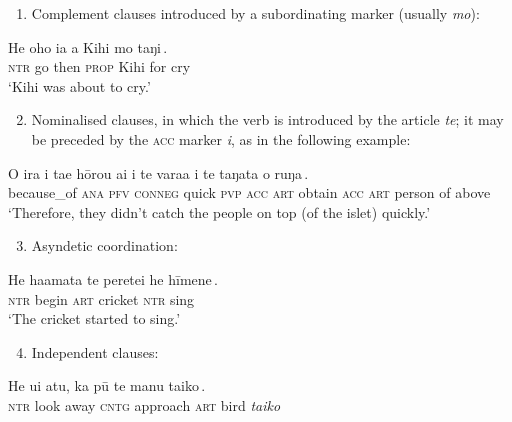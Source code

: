 \begin{enumerate}
\item 
Complement clauses introduced by a subordinating marker (usually \textit{mo}):
\end{enumerate}

\ea\label{ex:11.28}
\gll He oho ia a Kihi {\ob}mo taŋi\,{\cb}.\\
\textsc{ntr} go then \textsc{prop} Kihi {\db}for cry\\

\glt
‘Kihi was about to cry.’ \textstyleExampleref{[R215.024]} 
\z

\begin{enumerate}
\setcounter{enumi}{1}
\item 
Nominalised  clauses, in which the verb is introduced by the article \textit{te}; it may be preceded by the \textsc{acc} marker \textit{i}, as in the following example:
\end{enumerate}

\ea\label{ex:11.29}
\gll {\ꞌ}O ira i ta{\ꞌ}e hōrou ai {\ob}i te vara{\ꞌ}a i te taŋata o ruŋa\,{\cb}. \\
because\_of \textsc{ana} \textsc{pfv} \textsc{conneg} quick \textsc{pvp} {\db}\textsc{acc} \textsc{art} obtain \textsc{acc} \textsc{art} person of above \\

\glt
‘Therefore, they didn’t catch the people on top (of the islet) quickly.’ \textstyleExampleref{[R304.048]} 
\z

\begin{enumerate}
\setcounter{enumi}{2}
\item 
Asyndetic coordination:
\end{enumerate}

\ea\label{ex:11.30}
\gll He ha{\ꞌ}amata te perete{\ꞌ}i {\ob}he hīmene\,{\cb}. \\
\textsc{ntr} begin \textsc{art} cricket {\db}\textsc{ntr} sing \\

\glt
‘The cricket started to sing.’ \textstyleExampleref{[R212.052]} 
\z

\begin{enumerate}
\setcounter{enumi}{3}
\item 
Independent clauses:
\end{enumerate}


\ea\label{ex:11.31}
\gll He u{\ꞌ}i atu, {\ob}ka pū te manu taiko\,{\cb}. \\
\textsc{ntr} look away {\db}\textsc{cntg} approach \textsc{art} bird \textit{taiko} \\

